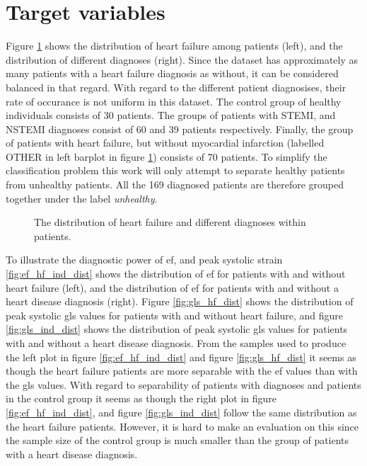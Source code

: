 \section{Target variables} \label{sec:target}
Figure \ref{fig:hf_ind_dist} shows the distribution of heart failure among patients (left), and the distribution of different diagnoses (right). Since the dataset has approximately as many patients with a heart failure diagnosis as without, it can be considered balanced in that regard. With regard to the different patient diagnosises, their rate of occurance is not uniform in this dataset. The control group of healthy individuals consists of 30 patients. The groups of patients with STEMI, and NSTEMI diagnoses consist of 60 and 39 patients respectively. Finally, the group of patients with heart failure, but without myocardial infarction (labelled OTHER in left barplot in figure \ref{fig:hf_ind_dist}) consists of 70 patients. To simplify the classification problem this work will only attempt to separate healthy patients from unhealthy patients. All the 169 diagnosed patients are therefore grouped together under the label \textit{unhealthy}. \bigskip

\begin{figure}[h]
    \centering
    
    \caption{The distribution of heart failure and different diagnoses within patients.}
    \label{fig:hf_ind_dist}
\end{figure}

To illustrate the diagnostic power of \acrshort{ef}, and peak systolic strain \ref{fig:ef_hf_ind_dist} shows the distribution of \acrshort{ef} for patients with and without heart failure (left), and the distribution of \acrshort{ef} for patients with and without a heart disease diagnosis (right). Figure \ref{fig:gls_hf_dist} shows the distribution of peak systolic \acrshort{gls} values for patients with and without heart failure, and figure \ref{fig:gls_ind_dist} shows the distribution of peak systolic \acrshort{gls} values for patients  with and without a heart disease diagnosis. From the samples used to produce the left plot in figure \ref{fig:ef_hf_ind_dist} and figure \ref{fig:gls_hf_dist} it seems as though the heart failure patients are more separable with the \acrshort{ef} values than with the \acrshort{gls} values. With regard to separability of patients with diagnoses and patients in the control group it seems as though the right plot in figure \ref{fig:ef_hf_ind_dist}, and figure \ref{fig:gls_ind_dist} follow the same distribution as the heart failure patients. However, it is hard to make an evaluation on this since the sample size of the control group is much smaller than the group of patients with a heart disease diagnosis.\bigskip

